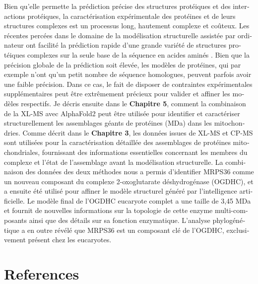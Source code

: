 \begin{otherlanguage}{french}
    Bien qu'elle permette la prédiction précise des structures protéiques et des interactions protéiques, la caractérisation expérimentale des protéines et de leurs structures complexes est un processus long, hautement complexe et coûteux. Les récentes percées dans le domaine de la modélisation structurelle assistée par ordinateur ont facilité la prédiction rapide d'une grande variété de structures protéiques complexes sur la seule base de la séquence en acides aminés \cite{RN5, RN4}. Bien que la précision globale de la prédiction soit élevée, les modèles de protéines, qui par exemple n'ont qu'un petit nombre de séquence homologues, peuvent parfois avoir une faible précision. Dans ce cas, le fait de disposer de contraintes expérimentales supplémentaires peut être extrêmement précieux pour valider et affiner les modèles respectifs.  Je décris ensuite dans le \textbf{Chapitre 5}, comment la combinaison de la XL-MS avec AlphaFold2 \cite{RN4} peut être utilisée pour identifier et caractériser structurellement les assemblages géants de protéines (MDa) dans les mitochondries. Comme décrit dans le \textbf{Chapitre 3}, les données issues de XL-MS et CP-MS sont utilisées pour la caractérisation détaillée des assemblages de protéines mitochondriales, fournissant des informations essentielles concernant les membres du complexe et l'état de l'assemblage avant la modélisation structurelle. La combinaison des données des deux méthodes nous a permis d'identifier MRPS36 comme un nouveau composant du complexe 2-oxoglutarate déshydrogénase (OGDHC), et a ensuite été utilisé pour affiner le modèle structurel généré par l'intelligence artificielle. Le modèle final de l'OGDHC eucaryote complet a une taille de 3,45 MDa et fournit de nouvelles informations sur la topologie de cette enzyme multi-composants ainsi que des détails sur sa fonction enzymatique. L'analyse phylogénétique a en outre révélé que MRPS36 est un composant clé de l'OGDHC, exclusivement présent chez les eucaryotes.
\end{otherlanguage}
\clearpage
\section*{References}


